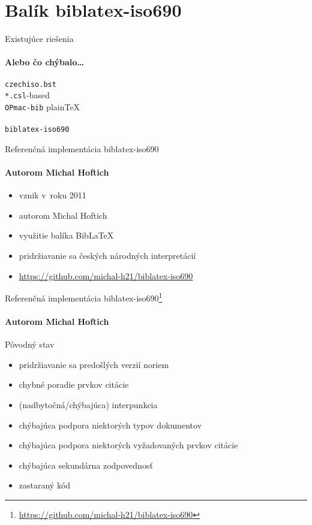 \documentclass{beamer}
\begin{document}




\section{Balík biblatex-iso690}

\begin{frame}{Existujúce riešenia}
\framesubtitle{Alebo čo chýbalo\dots}

\texttt{czechiso.bst}\\
\texttt{*.csl}-based\\
\texttt{OPmac-bib} plainTeX\\
\\
\texttt{biblatex-iso690}

\end{frame}

\begin{frame}{Referenčná implementácia \textsf{biblatex-iso690}}
\framesubtitle{Autorom Michal Hoftich}
\begin{itemize}
\item vznik v~roku 2011
\item autorom Michal Hoftich
\item využitie balíka BibLaTeX
\item pridržiavanie sa českých národných interpretácií
\item \url{https://github.com/michal-h21/biblatex-iso690}
\end{itemize}
\end{frame}

\begin{frame}{Referenčná implementácia \textsf{biblatex-iso690}\footnote[frame]{\url{https://github.com/michal-h21/biblatex-iso690}}}
\framesubtitle{Autorom Michal Hoftich}
Pôvodný stav
\begin{itemize}
\item pridržiavanie sa predošlých verzií noriem %
\item chybné poradie prvkov citácie %
\item (nadbytočná/chýbajúca) interpunkcia %
\item chýbajúca podpora niektorých typov dokumentov %
\item chýbajúca podpora niektorých vyžadovaných prvkov citácie %
\item chýbajúca sekundárna zodpovednosť %
\item zastaraný kód %
\end{itemize}
\end{frame}
\end{document}
